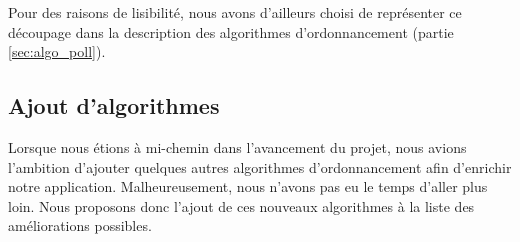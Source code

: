 			Pour des raisons de lisibilité, nous avons d'ailleurs choisi de représenter ce découpage dans la description des algorithmes d'ordonnancement (partie \ref{sec:algo_poll}).
			
		\subsection{Ajout d'algorithmes}
			Lorsque nous étions à mi-chemin dans l'avancement du projet, nous avions l'ambition d'ajouter quelques autres algorithmes d'ordonnancement afin d'enrichir notre application. Malheureusement, nous n'avons pas eu le temps d'aller plus loin. Nous proposons donc l'ajout de ces nouveaux algorithmes à la liste des améliorations possibles.
